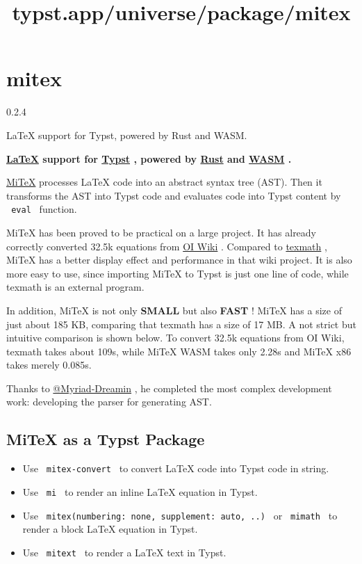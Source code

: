 \title{typst.app/universe/package/mitex}

\label{banner}
\section{mitex}\label{mitex}

{ 0.2.4 }

LaTeX support for Typst, powered by Rust and WASM.

\label{readme}
\textbf{\href{https://www.latex-project.org/}{LaTeX} support for
\href{https://typst.app/}{Typst} , powered by
\href{https://www.rust-lang.org/}{Rust} and
\href{https://webassembly.org/}{WASM} .}

\href{https://github.com/mitex-rs/mitex}{MiTeX} processes LaTeX code
into an abstract syntax tree (AST). Then it transforms the AST into
Typst code and evaluates code into Typst content by \texttt{\ eval\ }
function.

MiTeX has been proved to be practical on a large project. It has already
correctly converted 32.5k equations from
\href{https://github.com/OI-wiki/OI-wiki}{OI Wiki} . Compared to
\href{https://github.com/jgm/texmath}{texmath} , MiTeX has a better
display effect and performance in that wiki project. It is also more
easy to use, since importing MiTeX to Typst is just one line of code,
while texmath is an external program.

In addition, MiTeX is not only \textbf{SMALL} but also \textbf{FAST} !
MiTeX has a size of just about 185 KB, comparing that texmath has a size
of 17 MB. A not strict but intuitive comparison is shown below. To
convert 32.5k equations from OI Wiki, texmath takes about 109s, while
MiTeX WASM takes only 2.28s and MiTeX x86 takes merely 0.085s.

Thanks to \href{https://github.com/Myriad-Dreamin}{@Myriad-Dreamin} , he
completed the most complex development work: developing the parser for
generating AST.

\subsection{MiTeX as a Typst Package}\label{mitex-as-a-typst-package}

\begin{itemize}
\tightlist
\item
  Use \texttt{\ mitex-convert\ } to convert LaTeX code into Typst code
  in string.
\item
  Use \texttt{\ mi\ } to render an inline LaTeX equation in Typst.
\item
  Use \texttt{\ mitex(numbering:\ none,\ supplement:\ auto,\ ..)\ } or
  \texttt{\ mimath\ } to render a block LaTeX equation in Typst.
\item
  Use \texttt{\ mitext\ } to render a LaTeX text in Typst.
\end{itemize}

